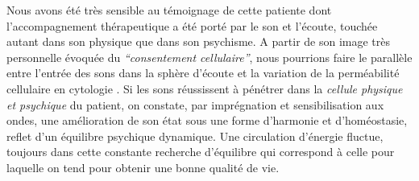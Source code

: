 Nous avons été très sensible au témoignage de cette patiente dont l'accompagnement thérapeutique a 
été porté par le son et l'écoute, touchée autant dans son physique que dans son psychisme.
A partir de son image très personnelle évoquée du \textit{``consentement cellulaire''}, nous pourrions 
faire le
parallèle entre l'entrée des sons dans la sphère d'écoute et la variation de la
perméabilité cellulaire en cytologie \cite{marieb:biologie}. Si les sons réussissent à pénétrer dans la
\textit{cellule physique et psychique} du patient,  on constate, par 
imprégnation et sensibilisation aux ondes,
une amélioration de son état %
sous une forme d'harmonie et d'homéostasie,  
\autocite[10]{marieb:biologie} 
reflet d'un équilibre psychique dynamique.  
Une circulation d'énergie  fluctue, toujours dans cette  constante recherche d'équilibre qui 
correspond  à celle pour laquelle on tend pour obtenir  une bonne qualité de vie.

